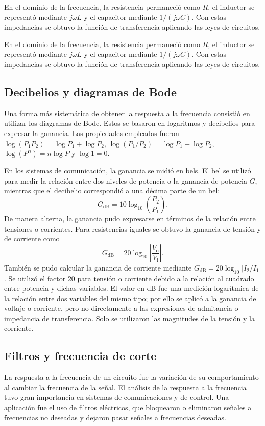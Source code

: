\documentclass[12pt,a4paper]{article}
\begin{document}
En el dominio de la frecuencia, la resistencia permaneció como \(R\), el inductor se representó mediante \(j\omega L\) y el capacitor mediante \(1/(j\omega C)\). Con estas impedancias se obtuvo la función de transferencia aplicando las leyes de circuitos.

En el dominio de la frecuencia, la resistencia permaneció como \(R\), el inductor se representó mediante \(j\omega L\) y el capacitor mediante \(1/(j\omega C)\). Con estas impedancias se obtuvo la función de transferencia aplicando las leyes de circuitos.

\subsection{Decibelios y diagramas de Bode}
Una forma más sistemática de obtener la respuesta a la frecuencia consistió en utilizar los diagramas de Bode. Estos se basaron en logaritmos y decibelios para expresar la ganancia. Las propiedades empleadas fueron \(\log(P_1P_2)=\log P_1+\log P_2\), \(\log(P_1/P_2)=\log P_1-\log P_2\), \(\log(P^n)=n\log P\) y \(\log 1=0\).

En los sistemas de comunicación, la ganancia se midió en bels. El bel se utilizó para medir la relación entre dos niveles de potencia o la ganancia de potencia \(G\), mientras que el decibelio correspondió a una décima parte de un bel:
\begin{equation}
    G_{\mathrm{dB}}=10\log_{10}\left(\frac{P_2}{P_1}\right).
    \label{eq:potenciadb}
\end{equation}
De manera alterna, la ganancia pudo expresarse en términos de la relación entre tensiones o corrientes. Para resistencias iguales se obtuvo la ganancia de tensión y de corriente como
\begin{equation}
    G_{\mathrm{dB}}=20\log_{10}\left|\frac{V_{\mathrm{o}}}{V_{\mathrm{i}}}\right|.
    \label{eq:db}
\end{equation}
También se pudo calcular la ganancia de corriente mediante \(G_{\mathrm{dB}}=20\log_{10}|I_2/I_1|\). Se utilizó el factor 20 para tensión o corriente debido a la relación al cuadrado entre potencia y dichas variables. El valor en dB fue una medición logarítmica de la relación entre dos variables del mismo tipo; por ello se aplicó a la ganancia de voltaje o corriente, pero no directamente a las expresiones de admitancia o impedancia de transferencia. Solo se utilizaron las magnitudes de la tensión y la corriente.

\subsection{Filtros y frecuencia de corte}
La respuesta a la frecuencia de un circuito fue la variación de su comportamiento al cambiar la frecuencia de la señal. El análisis de la respuesta a la frecuencia tuvo gran importancia en sistemas de comunicaciones y de control. Una aplicación fue el uso de filtros eléctricos, que bloquearon o eliminaron señales a frecuencias no deseadas y dejaron pasar señales a frecuencias deseadas.
\end{document}
